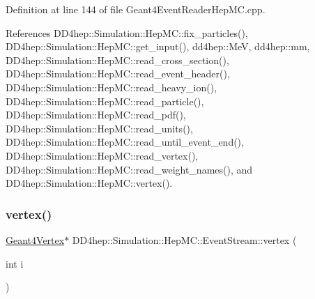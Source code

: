 Definition at line 144 of file Geant4\+Event\+Reader\+Hep\+M\+C.\+cpp.



References D\+D4hep\+::\+Simulation\+::\+Hep\+M\+C\+::fix\+\_\+particles(), D\+D4hep\+::\+Simulation\+::\+Hep\+M\+C\+::get\+\_\+input(), dd4hep\+::\+MeV, dd4hep\+::mm, D\+D4hep\+::\+Simulation\+::\+Hep\+M\+C\+::read\+\_\+cross\+\_\+section(), D\+D4hep\+::\+Simulation\+::\+Hep\+M\+C\+::read\+\_\+event\+\_\+header(), D\+D4hep\+::\+Simulation\+::\+Hep\+M\+C\+::read\+\_\+heavy\+\_\+ion(), D\+D4hep\+::\+Simulation\+::\+Hep\+M\+C\+::read\+\_\+particle(), D\+D4hep\+::\+Simulation\+::\+Hep\+M\+C\+::read\+\_\+pdf(), D\+D4hep\+::\+Simulation\+::\+Hep\+M\+C\+::read\+\_\+units(), D\+D4hep\+::\+Simulation\+::\+Hep\+M\+C\+::read\+\_\+until\+\_\+event\+\_\+end(), D\+D4hep\+::\+Simulation\+::\+Hep\+M\+C\+::read\+\_\+vertex(), D\+D4hep\+::\+Simulation\+::\+Hep\+M\+C\+::read\+\_\+weight\+\_\+names(), and D\+D4hep\+::\+Simulation\+::\+Hep\+M\+C\+::vertex().

\hypertarget{class_d_d4hep_1_1_simulation_1_1_hep_m_c_1_1_event_stream_ac4d60be95873b8933646c17f4a306058}{}\label{class_d_d4hep_1_1_simulation_1_1_hep_m_c_1_1_event_stream_ac4d60be95873b8933646c17f4a306058} 
\subsubsection{\texorpdfstring{vertex()}{vertex()}}
{\footnotesize\ttfamily \hyperlink{class_d_d4hep_1_1_simulation_1_1_geant4_vertex}{Geant4\+Vertex}$\ast$ D\+D4hep\+::\+Simulation\+::\+Hep\+M\+C\+::\+Event\+Stream\+::vertex (\begin{DoxyParamCaption}\item[{int}]{i }\end{DoxyParamCaption})}

\hypertarget{class_d_d4hep_1_1_simulation_1_1_hep_m_c_1_1_event_stream_acc8b24a014d6af70e07a6396375692e9}{}\label{class_d_d4hep_1_1_simulation_1_1_hep_m_c_1_1_event_stream_acc8b24a014d6af70e07a6396375692e9} 
